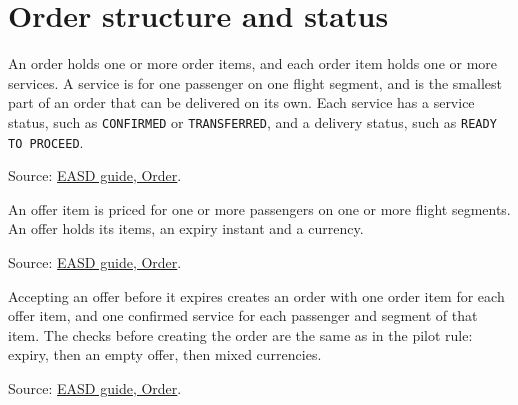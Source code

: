 
\section{Order structure and status}

\begin{definition}
  \label{def:c01-structure}
  An order holds one or more order items, and each order item holds one or
  more services.  A service is for one passenger on one flight segment, and is
  the smallest part of an order that can be delivered on its own.  Each
  service has a service status, such as \texttt{CONFIRMED} or
  \texttt{TRANSFERRED}, and a delivery status, such as
  \texttt{READY TO PROCEED}.

  Source: \href{https://standards.atlassian.net/wiki/spaces/EASD/pages/574849062/Order}{EASD guide, Order}.
\end{definition}

\begin{definition}
  \label{def:one-offer}
  An offer item is priced for one or more passengers on one or more flight
  segments.  An offer holds its items, an expiry instant and a currency.

  Source: \href{https://standards.atlassian.net/wiki/spaces/EASD/pages/574849062/Order}{EASD guide, Order}.
\end{definition}

\begin{definition}
  \label{def:one-accept}
  Accepting an offer before it expires creates an order with one order item
  for each offer item, and one confirmed service for each passenger and
  segment of that item.  The checks before creating the order are the same as
  in the pilot rule: expiry, then an empty offer, then mixed currencies.

  Source: \href{https://standards.atlassian.net/wiki/spaces/EASD/pages/574849062/Order}{EASD guide, Order}.
\end{definition}

